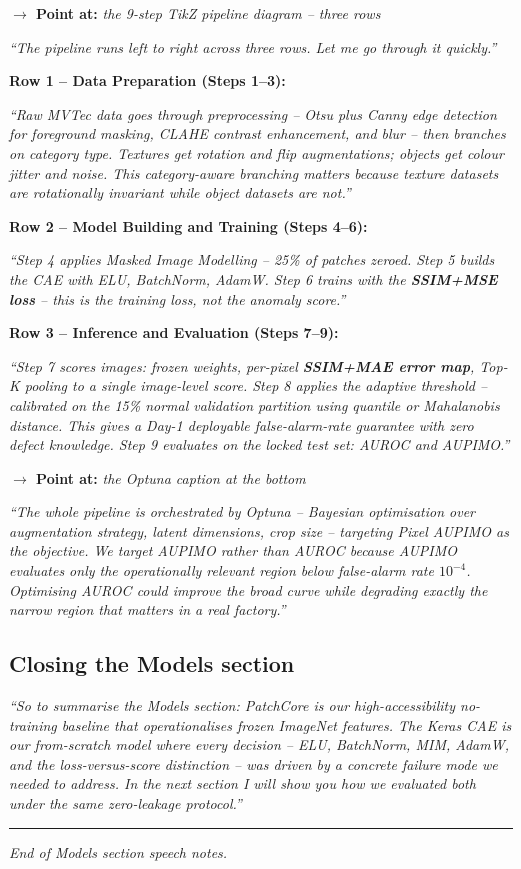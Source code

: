 \documentclass[12pt, a4paper]{article}
\newcommand{\say}[1]{%
  \begin{mdframed}[style=saybox]
  \itshape ``#1''
  \end{mdframed}
}
\newcommand{\pointer}[1]{\noindent\textbf{\color{teal}$\rightarrow$ Point at:} \textit{#1}\\[2pt]}
\begin{document}
\pointer{the 9-step TikZ pipeline diagram -- three rows}

\say{The pipeline runs left to right across three rows. Let me go through it quickly.}

\vspace{4pt}
\noindent\textbf{Row 1 -- Data Preparation (Steps 1--3):}

\say{Raw MVTec data goes through preprocessing -- Otsu plus Canny edge detection for foreground masking, CLAHE contrast enhancement, and blur -- then branches on category type. Textures get rotation and flip augmentations; objects get colour jitter and noise. This category-aware branching matters because texture datasets are rotationally invariant while object datasets are not.}

\vspace{4pt}
\noindent\textbf{Row 2 -- Model Building and Training (Steps 4--6):}

\say{Step 4 applies Masked Image Modelling -- 25\% of patches zeroed. Step 5 builds the CAE with ELU, BatchNorm, AdamW. Step 6 trains with the \textbf{SSIM+MSE loss} -- this is the training loss, not the anomaly score.}

\vspace{4pt}
\noindent\textbf{Row 3 -- Inference and Evaluation (Steps 7--9):}

\say{Step 7 scores images: frozen weights, per-pixel \textbf{SSIM+MAE error map}, Top-K pooling to a single image-level score. Step 8 applies the adaptive threshold -- calibrated on the 15\% normal validation partition using quantile or Mahalanobis distance. This gives a Day-1 deployable false-alarm-rate guarantee with zero defect knowledge. Step 9 evaluates on the locked test set: AUROC and AUPIMO.}

\pointer{the Optuna caption at the bottom}

\say{The whole pipeline is orchestrated by Optuna -- Bayesian optimisation over augmentation strategy, latent dimensions, crop size -- targeting Pixel AUPIMO as the objective. We target AUPIMO rather than AUROC because AUPIMO evaluates only the operationally relevant region below false-alarm rate $10^{-4}$. Optimising AUROC could improve the broad curve while degrading exactly the narrow region that matters in a real factory.}

\subsection{Closing the Models section}

\say{So to summarise the Models section: PatchCore is our high-accessibility no-training baseline that operationalises frozen ImageNet features. The Keras CAE is our from-scratch model where every decision -- ELU, BatchNorm, MIM, AdamW, and the loss-versus-score distinction -- was driven by a concrete failure mode we needed to address. In the next section I will show you how we evaluated both under the same zero-leakage protocol.}

\vspace{2em}
\rule{\linewidth}{0.8pt}
{\small\color{muted}\textit{End of Models section speech notes.}}
\end{document}
